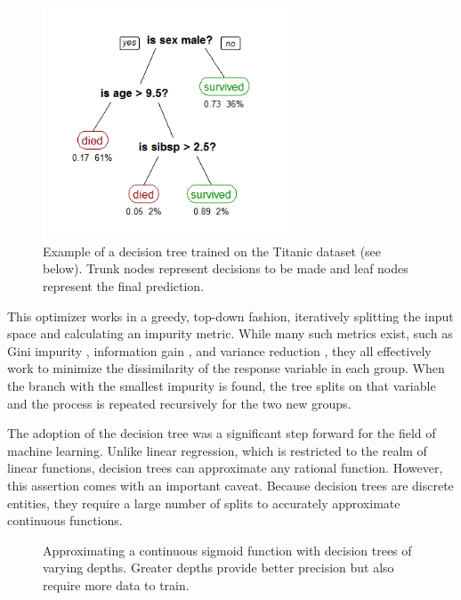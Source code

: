 \begin{figure}
\includegraphics[width=0.65\textwidth]{fig/decision_tree_example.png}
\centering
\caption{Example of a decision tree trained on the Titanic dataset (see below). Trunk nodes represent decisions to be made and leaf nodes represent the final prediction.}
\label{fig:decision_tree_example}
\end{figure}

This optimizer works in a greedy, top-down fashion, iteratively splitting the input space and calculating an impurity metric. While many such metrics exist, such as Gini impurity \citep{Breiman1984ClassificationTrees}, information gain \citep{Kullback1951OnSufficiency}, and variance reduction \citep{Breiman1984ClassificationTrees}, they all effectively work to minimize the dissimilarity of the response variable in each group. When the branch with the smallest impurity is found, the tree splits on that variable and the process is repeated recursively for the two new groups. 

The adoption of the decision tree was a significant step forward for the field of machine learning. Unlike linear regression, which is restricted to the realm of linear functions, decision trees can approximate any rational function. However, this assertion comes with an important caveat. Because decision trees are discrete entities, they require a large number of splits to accurately approximate continuous functions. 

\begin{figure}[t]
\caption{Approximating a continuous sigmoid function with decision trees of varying depths. Greater depths provide better precision but also require more data to train.}

\centering
\end{figure}

